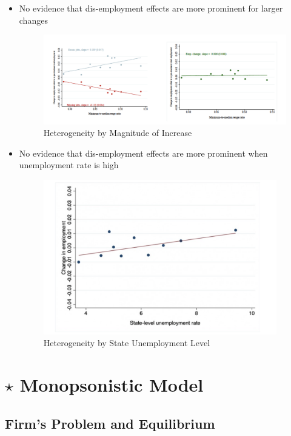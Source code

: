         \begin{itemize}
            \item No evidence that dis-employment effects are more prominent for larger changes
            \begin{figure}[H]
                \centering
                \includegraphics[width=5.5in]{images/ch2/Freq_approach_5.png}
                \caption{Heterogeneity by Magnitude of Increase}
            \end{figure}
            \item No evidence that dis-employment effects are more prominent when unemployment rate is high
            \begin{figure}[H]
                \centering
                \includegraphics[width=4in]{images/ch2/Freq_approach_6.png}
                \caption{Heterogeneity by State Unemployment Level}
            \end{figure}
        \end{itemize}
        
        
\section{$\star$ Monopsonistic Model}

    \subsection{Firm's Problem and Equilibrium}
    
